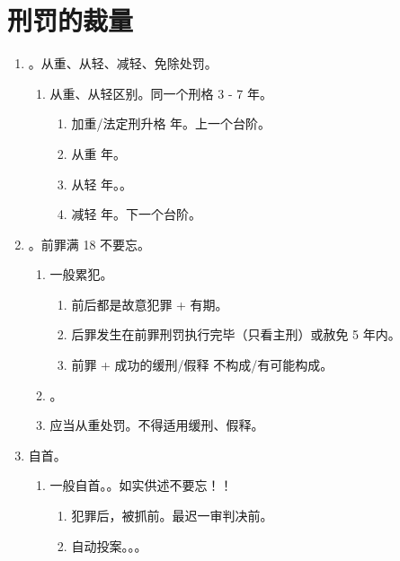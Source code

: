 \section{刑罚的裁量}
\begin{enumerate}
  \item {}。从重、从轻、减轻、免除处罚。
        \begin{enumerate}
          \item 从重、从轻区别。同一个刑格 3 - 7 年。
                \begin{enumerate}
                  \item 加重/法定刑升格 \yjt {} 年。上一个台阶。
                  \item 从重  年。
                  \item 从轻  年。\xjt {}。
                  \item 减轻 \yjt {} 年。下一个台阶。
                \end{enumerate}
        \end{enumerate}
  \item {}。前罪满 18 不要忘。
        \begin{enumerate}
          \item 一般累犯。
                \begin{enumerate}
                  \item 前后都是故意犯罪 + 有期。
                  \item 后罪发生在前罪刑罚执行完毕（只看主刑）或赦免 5 年内。
                  \item 前罪 + 成功的缓刑/假释 \yjt 不构成/有可能构成。
                \end{enumerate}
          \item {}。
          \item 应当从重处罚。不得适用缓刑、假释。
        \end{enumerate}
  \item 自首。
        \begin{enumerate}
          \item 一般自首。。如实供述不要忘！！
                \begin{enumerate}
                  \item 犯罪后，被抓前。最迟一审判决前。
                  \item 自动投案。。。
                        \begin{enumerate}

\end{enumerate}
\end{enumerate}
\end{enumerate}
\end{enumerate}
